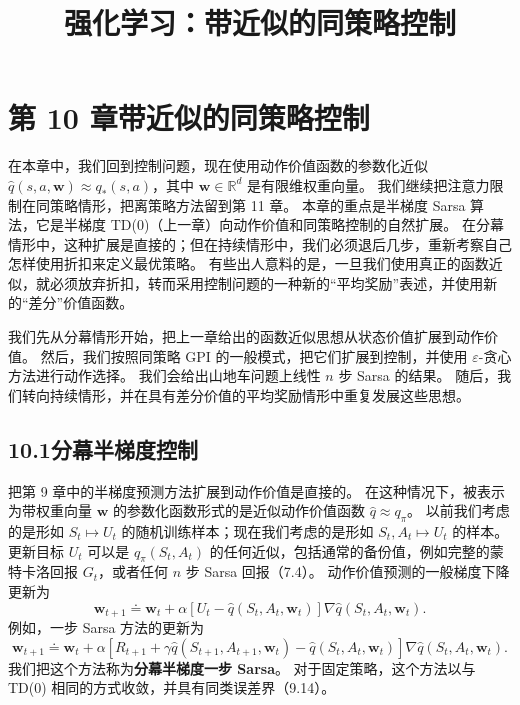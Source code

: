 \documentclass[UTF8, 12pt, fontset=fandol, oneside]{ctexart}
\title{强化学习：带近似的同策略控制}
\author{}
\date{}
\begin{document}
\maketitle

\section*{第 10 章\quad 带近似的同策略控制}

在本章中，我们回到控制问题，现在使用动作价值函数的参数化近似
$\hat q(s,a,\mathbf{w})\approx q_*(s,a)$，其中 $\mathbf{w}\in\mathbb{R}^d$ 是有限维权重向量。
我们继续把注意力限制在同策略情形，把离策略方法留到第 11 章。
本章的重点是半梯度 Sarsa 算法，它是半梯度 TD(0)（上一章）向动作价值和同策略控制的自然扩展。
在分幕情形中，这种扩展是直接的；但在持续情形中，我们必须退后几步，重新考察自己怎样使用折扣来定义最优策略。
有些出人意料的是，一旦我们使用真正的函数近似，就必须放弃折扣，转而采用控制问题的一种新的“平均奖励”表述，并使用新的“差分”价值函数。

我们先从分幕情形开始，把上一章给出的函数近似思想从状态价值扩展到动作价值。
然后，我们按照同策略 GPI 的一般模式，把它们扩展到控制，并使用 $\varepsilon$-贪心方法进行动作选择。
我们会给出山地车问题上线性 $n$ 步 Sarsa 的结果。
随后，我们转向持续情形，并在具有差分价值的平均奖励情形中重复发展这些思想。

\subsection*{10.1\quad 分幕半梯度控制}

把第 9 章中的半梯度预测方法扩展到动作价值是直接的。
在这种情况下，被表示为带权重向量 $\mathbf{w}$ 的参数化函数形式的是近似动作价值函数 $\hat q\approx q_\pi$。
以前我们考虑的是形如 $S_t\mapsto U_t$ 的随机训练样本；现在我们考虑的是形如 $S_t,A_t\mapsto U_t$ 的样本。
更新目标 $U_t$ 可以是 $q_\pi(S_t,A_t)$ 的任何近似，包括通常的备份值，例如完整的蒙特卡洛回报 $G_t$，或者任何 $n$ 步 Sarsa 回报（7.4）。
动作价值预测的一般梯度下降更新为
\begin{equation}
\mathbf{w}_{t+1}\doteq \mathbf{w}_t+\alpha\left[U_t-\hat q(S_t,A_t,\mathbf{w}_t)\right]\nabla\hat q(S_t,A_t,\mathbf{w}_t).
\tag{10.1}
\end{equation}
例如，一步 Sarsa 方法的更新为
\begin{equation}
\mathbf{w}_{t+1}\doteq \mathbf{w}_t+\alpha\left[R_{t+1}+\gamma\hat q(S_{t+1},A_{t+1},\mathbf{w}_t)-\hat q(S_t,A_t,\mathbf{w}_t)\right]\nabla\hat q(S_t,A_t,\mathbf{w}_t).
\tag{10.2}
\end{equation}
我们把这个方法称为\textbf{分幕半梯度一步 Sarsa}。
对于固定策略，这个方法以与 TD(0) 相同的方式收敛，并具有同类误差界（9.14）。
\end{document}

